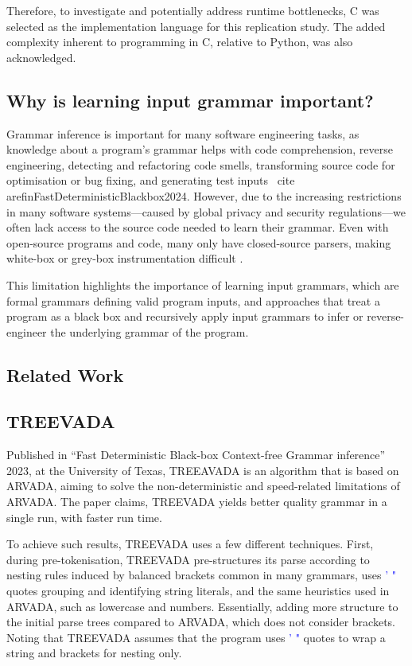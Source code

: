 Therefore, to investigate and potentially address runtime bottlenecks, C was selected as the implementation language for this replication study. The added complexity inherent to programming in C, relative to Python, was also acknowledged.

\subsection{Why is learning input grammar important?}
Grammar inference is important for many software engineering tasks, as knowledge about a program's grammar helps with code comprehension, reverse engineering, detecting and refactoring code smells, transforming source code for optimisation or bug fixing, and generating test inputs \ cite {arefinFastDeterministicBlackbox2024}. However, due to the increasing restrictions in many software systems—caused by global privacy and security regulations—we often lack access to the source code needed to learn their grammar.  Even with open-source programs and code, many only have closed-source parsers, making white-box or grey-box instrumentation difficult \cite{arefinFastDeterministicBlackbox2024,liIncrementalContextfreeGrammar2024}.

\vspace{\baselineskip}
This limitation highlights the importance of learning input grammars, which are formal grammars defining valid program inputs, and approaches that treat a program as a black box and recursively apply input grammars to infer or reverse-engineer the underlying grammar of the program.


\subsection{Related Work}

\subsection{TREEVADA}

Published in \enquote{Fast Deterministic Black-box Context-free Grammar inference} 2023, at the University of Texas\cite{arefinFastDeterministicBlackbox2024}, TREEAVADA is an algorithm that is based on ARVADA\cite{kulkarniLearningHighlyRecursive2021}, aiming to solve the non-deterministic and speed-related limitations of ARVADA. The paper claims, TREEVADA yields better quality grammar in a single run, with faster run time.

\vspace{\baselineskip}
To achieve such results, TREEVADA uses a few different techniques. First, during pre-tokenisation, TREEVADA pre-structures its parse according to nesting rules induced by balanced brackets common in many grammars, uses \textcolor{blue}{' "} quotes grouping and identifying string literals, and the same heuristics used in ARVADA, such as lowercase and numbers. Essentially, adding more structure to the initial parse trees compared to ARVADA, which does not consider brackets. Noting that TREEVADA assumes that the program uses \textcolor{blue}{' "} quotes to wrap a string and brackets for nesting only.

